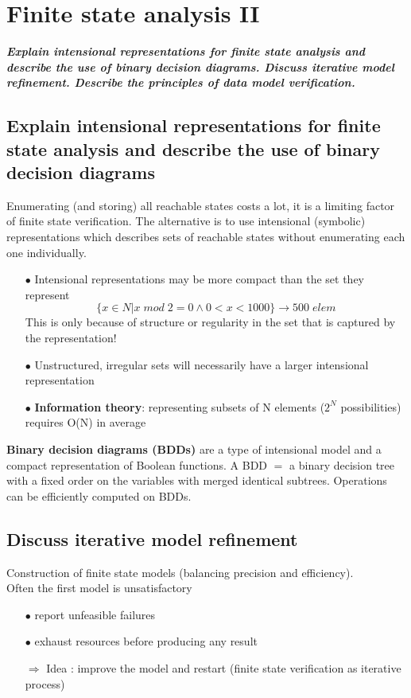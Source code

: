 \documentclass{article}
\begin{document}
\newpage
\section{Finite state analysis II}
\textbf{\textit{Explain intensional representations for finite state analysis and describe the use of binary decision diagrams. Discuss iterative model refinement. Describe the principles of data model verification.}}

\subsection{Explain intensional representations for finite state analysis and describe the use of binary decision diagrams}
Enumerating (and storing) all reachable states costs a lot, it is a limiting factor of finite state verification.
The alternative is to use intensional (symbolic) representations which describes sets of reachable states
without enumerating each one individually.
\begin{itemize}
    \item [$\bullet$] Intensional representations may be more compact than the set they represent
    $$\{x\in N | x\; mod \;2 = 0 \wedge 0 < x < 1000  \} \rightarrow 500\; elem$$
    This is only because of structure or regularity in the set that is captured by the representation!

    \item [$\bullet$]Unstructured, irregular sets will necessarily have a larger intensional representation

    \item [$\bullet$]\textbf{Information theory}: representing subsets of N elements ($2^N$ possibilities) requires O(N) in average
\end{itemize}
\vspace{1em}
\textbf{Binary decision diagrams (BDDs)} are a type of intensional model and a compact representation of Boolean functions. A BDD $=$ a binary decision tree with a fixed order on the variables with merged identical subtrees. Operations can be efficiently computed on BDDs.


\subsection{Discuss iterative model refinement}
\noindent Construction of finite state models (balancing
precision and efficiency).\\
Often the first model is unsatisfactory
\begin{itemize}
    \item [$\bullet$]report unfeasible failures
    \item [$\bullet$]exhaust resources before producing any result
    \item [$\Rightarrow$]Idea : improve the model and restart (finite state verification as iterative process)

\end{itemize}
\end{document}
